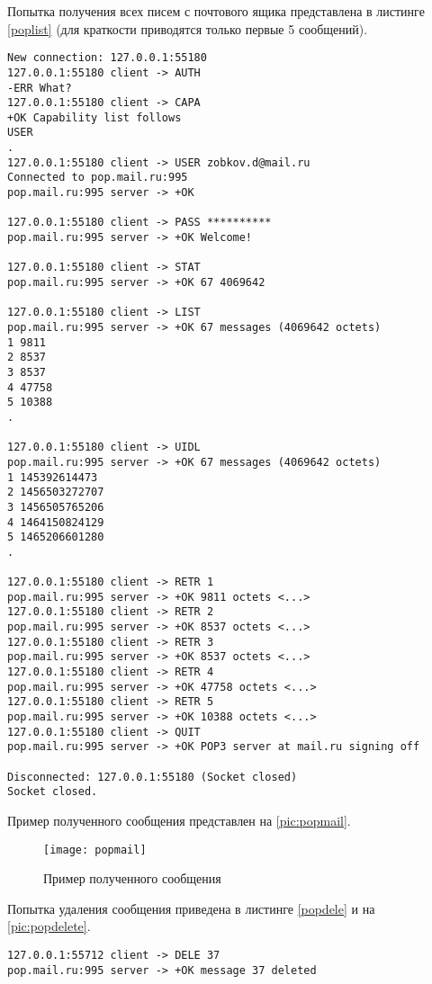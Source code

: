 Попытка получения всех писем с почтового ящика представлена в листинге \vref{poplist} (для краткости приводятся только первые 5 сообщений).

\begin{lstlisting}[label=poplist,caption=Получение всех сообщений (вывод сокращен до 5 сообщений)]
New connection: 127.0.0.1:55180
127.0.0.1:55180	client -> AUTH
-ERR What?
127.0.0.1:55180	client -> CAPA
+OK Capability list follows
USER
.
127.0.0.1:55180	client -> USER zobkov.d@mail.ru
Connected to pop.mail.ru:995
pop.mail.ru:995	server -> +OK

127.0.0.1:55180	client -> PASS **********
pop.mail.ru:995	server -> +OK Welcome!

127.0.0.1:55180	client -> STAT
pop.mail.ru:995	server -> +OK 67 4069642

127.0.0.1:55180	client -> LIST
pop.mail.ru:995	server -> +OK 67 messages (4069642 octets)
1 9811
2 8537
3 8537
4 47758
5 10388
.

127.0.0.1:55180	client -> UIDL
pop.mail.ru:995	server -> +OK 67 messages (4069642 octets)
1 145392614473
2 1456503272707
3 1456505765206
4 1464150824129
5 1465206601280
.

127.0.0.1:55180	client -> RETR 1
pop.mail.ru:995	server -> +OK 9811 octets <...>
127.0.0.1:55180	client -> RETR 2
pop.mail.ru:995	server -> +OK 8537 octets <...>
127.0.0.1:55180	client -> RETR 3
pop.mail.ru:995	server -> +OK 8537 octets <...>
127.0.0.1:55180	client -> RETR 4
pop.mail.ru:995	server -> +OK 47758 octets <...>
127.0.0.1:55180	client -> RETR 5
pop.mail.ru:995	server -> +OK 10388 octets <...>
127.0.0.1:55180	client -> QUIT
pop.mail.ru:995	server -> +OK POP3 server at mail.ru signing off

Disconnected: 127.0.0.1:55180 (Socket closed)
Socket closed.
\end{lstlisting}

Пример полученного сообщения представлен на \vref{pic:popmail}.

\begin{figure}[H]
	\centering
	\texttt{[image: popmail]}
	\caption{Пример полученного сообщения}
	\label{pic:popmail}
\end{figure}

Попытка удаления сообщения приведена в листинге \vref{popdele} и на \vref{pic:popdelete}.

\begin{lstlisting}[label=popdele,caption=Удаление сообщения]
127.0.0.1:55712	client -> DELE 37
pop.mail.ru:995	server -> +OK message 37 deleted
\end{lstlisting}

